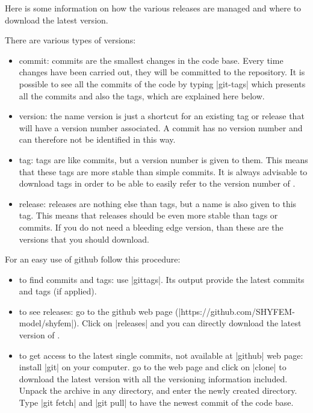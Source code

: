 Here is some information on how the various releases are managed and where to
download the latest version.

There are various types of versions:

\begin{itemize}

\item commit: commits are the smallest changes in the code base. 
Every time changes have been carried out, they will be committed to the repository. 
It is possible to see all the commits of the code
by typing |git-tags| which presents all the commits and also the tags,
which are explained here below.

\item version: the name version is just a shortcut for an existing tag 
or release that will have a version number associated.  
A commit has no version number and can therefore not
be identified in this way.

\item tag: tags are like commits, but a version number is given to
them. This means that these tags are more stable than simple commits. It
is always advisable to download tags in order to be able to easily refer
to the version number of \shyfem{}.

\item release: releases are nothing else than tags, but a name is also
given to this tag. This means that releases should be even more stable
than tags or commits. If you do not need a bleeding edge version, than
these are the versions that you should download.

\end{itemize}

For an easy use of github follow this procedure:
\begin{itemize}
\item to find commits and tags: use |gittags|. Its output provide the latest
 commits and tags (if applied). 

\item to see releases:  go to the github web page
(|https://github.com/SHYFEM-model/shyfem|). Click on |releases| and 
you can directly download the latest
version of \shyfem{}.

 \item to get access to the latest single commits, not available at |github| web page:
\subitem install |git| on your computer. 
\subitem go to the web page and click on |clone| to download the latest version with all
the versioning information included. 
\subitem Unpack the archive in any directory, and enter the newly created directory.
\subitem Type |git fetch| and |git pull| to have the newest commit of the code base.
\end{itemize}

